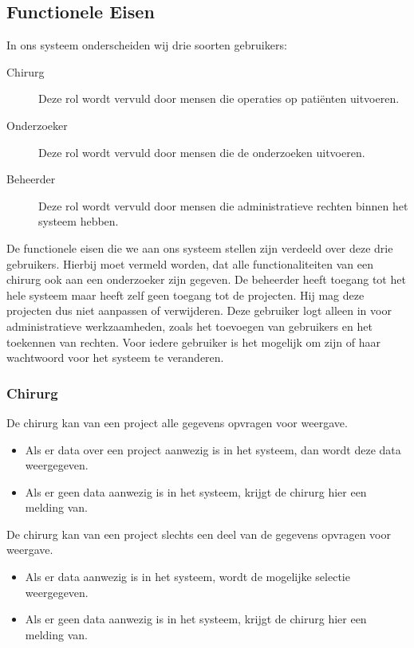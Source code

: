 \subsection{Functionele Eisen}
\label{functionele_eisen}
In ons systeem onderscheiden wij drie soorten gebruikers:
\begin{description}
	\item[Chirurg] Deze rol wordt vervuld door mensen die operaties op pati\"enten uitvoeren.
	\item[Onderzoeker] Deze rol wordt vervuld door mensen die de onderzoeken uitvoeren. 
	\item[Beheerder] Deze rol wordt vervuld door mensen die administratieve rechten binnen het systeem hebben.
\end{description}
De functionele eisen die we aan ons systeem stellen zijn verdeeld over deze drie gebruikers. 
Hierbij moet vermeld worden, dat alle functionaliteiten van een chirurg ook aan een onderzoeker zijn gegeven.
De beheerder heeft toegang tot het hele systeem maar heeft zelf geen toegang tot de projecten. 
Hij mag deze projecten dus niet aanpassen of verwijderen. 
Deze gebruiker logt alleen in voor administratieve werkzaamheden, zoals het toevoegen van gebruikers en het toekennen van rechten.
Voor iedere gebruiker is het mogelijk om zijn of haar wachtwoord voor het systeem te veranderen.

\subsubsection{Chirurg}

De chirurg kan van een project alle gegevens opvragen voor weergave.
\begin{itemize}
	\item Als er data over een project aanwezig is in het systeem, dan wordt deze data weergegeven.
	\item Als er geen data aanwezig is in het systeem, krijgt de chirurg hier een melding van. 
\end{itemize}

\noindent
De chirurg kan van een project slechts een deel van de gegevens opvragen voor weergave.
\begin{itemize}
	\item Als er data aanwezig is in het systeem, wordt de mogelijke selectie weergegeven.
	\item Als er geen data aanwezig is in het systeem, krijgt de chirurg hier een melding van.
\end{itemize}

